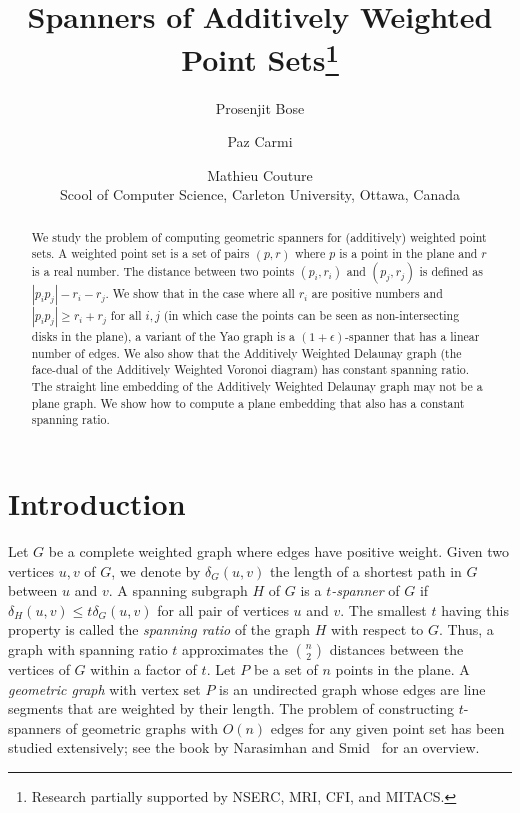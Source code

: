 \documentclass[pdftex,leqno,fleqn,12pt]{article}
\begin{document}
\title{Spanners of Additively Weighted Point Sets\thanks{Research partially supported by NSERC, MRI, CFI, and MITACS.}}
\author{Prosenjit Bose \and Paz Carmi \and Mathieu Couture\\ {\small Scool of Computer Science, Carleton University, Ottawa, Canada}}




\maketitle

\begin{abstract} We study the problem of computing geometric spanners for
(additively) weighted point sets. A weighted point set is a set of pairs $(p,r)$ where $p$ is a
point in the plane and $r$ is a real number. The distance between two points $(p_i,r_i)$ and
$(p_j,r_j)$ is defined as $|p_ip_j|-r_i-r_j$. We show that in the case where all $r_i$ are positive
numbers and $|p_ip_j|\geq r_i+r_j$ for all $i,j$ (in which case the points can be seen as
non-intersecting disks in the plane), a variant of the Yao graph is a $(1+\epsilon)$-spanner that
has a linear number of edges. We also show that the Additively Weighted Delaunay graph (the
face-dual of the Additively Weighted Voronoi diagram) has constant spanning ratio. The straight
line embedding of the Additively Weighted Delaunay graph may not be a plane graph. 
We show how to compute a plane embedding that also has a
constant spanning ratio.  \end{abstract}

\newcommand{\UDG}{\rm UDG}
\newcommand{\bis}{\rm bis}

\newpage

\section{Introduction}

Let $G$ be a complete weighted graph where edges have positive weight. Given
two vertices $u,v$ of $G$, we denote by $\delta_G(u,v)$ the length of a
shortest path in $G$ between $u$ and $v$. A spanning subgraph $H$ of $G$ is
a \emph{$t$-spanner} of $G$ if $\delta_H(u,v)\leq t\delta_G(u,v)$ for all
pair of vertices $u$ and $v$. The smallest $t$ having this property is
called the \emph{spanning ratio} of the graph $H$ with respect to $G$. Thus,
a graph with spanning ratio $t$ approximates the $n \choose 2$ distances
between the vertices of $G$ within a factor of $t$. Let $P$ be a set of $n$
points in the plane. A \emph{geometric graph} with vertex set $P$ is an
undirected graph whose edges are line segments that are weighted by their
length.  The problem of constructing $t$-spanners of geometric graphs with
$O(n)$ edges for any given point set has been studied extensively; see the
book by Narasimhan and Smid~\cite{smid07} for an overview.
\end{document}
